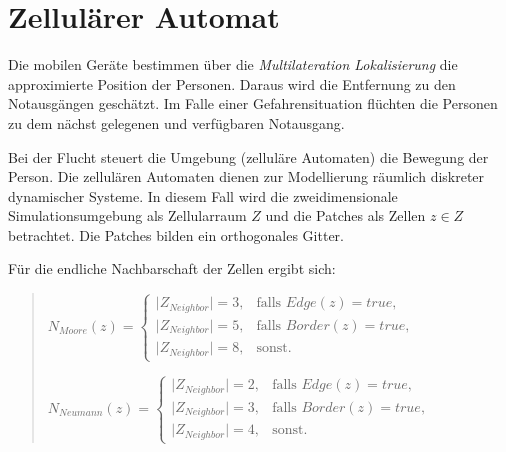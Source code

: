 \section{Zellul\"arer Automat}
\label{sec:cellular_automaton}


Die mobilen Geräte bestimmen über die \emph{Multilateration Lokalisierung} die approximierte Position der Personen. Daraus wird die Entfernung zu den Notausgängen geschätzt. Im Falle einer Gefahrensituation flüchten die Personen zu dem nächst gelegenen und verfügbaren Notausgang.

Bei der Flucht steuert die Umgebung (zelluläre Automaten) die Bewegung der Person. Die zellulären Automaten dienen zur Modellierung räumlich diskreter dynamischer Systeme. In diesem Fall wird die zweidimensionale Simulationsumgebung als Zellularraum $Z$ und die Patches als Zellen $z \in Z$ betrachtet. Die Patches bilden ein orthogonales Gitter.

Für die endliche Nachbarschaft der Zellen ergibt sich:

\begin{quote}
$ N_{Moore}(z)=\left\{\begin{array}{cl} \vert Z_{Neighbor}\vert = 3, & \mbox{falls }Edge(z) = true,\\ \vert Z_{Neighbor}\vert = 5, & \mbox{falls }Border(z) = true,\\ \vert Z_{Neighbor}\vert = 8, & \mbox{sonst.} \end{array}\right. $

$ N_{Neumann}(z)=\left\{\begin{array}{cl} \vert Z_{Neighbor}\vert = 2, & \mbox{falls }Edge(z) = true,\\ \vert Z_{Neighbor}\vert = 3, & \mbox{falls }Border(z) = true,\\ \vert Z_{Neighbor}\vert = 4, & \mbox{sonst.} \end{array}\right. $
\end{quote}

